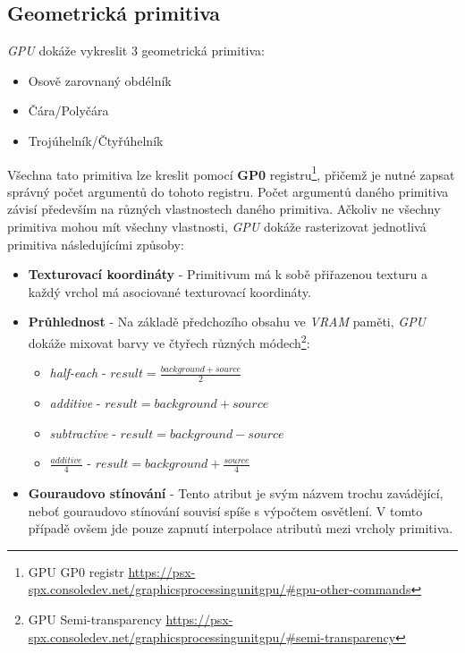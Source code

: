 \subsection{Geometrická primitiva}

\textit{GPU} dokáže vykreslit 3 geometrická primitiva:

\begin{itemize}
    \item{Osově zarovnaný obdélník}
    \item{Čára/Polyčára}
    \item{Trojúhelník/Čtyřúhelník}
\end{itemize}

Všechna tato primitiva lze kreslit pomocí \textbf{GP0} registru\footnote{GPU GP0 registr\cite{PSXSpec} \url{https://psx-spx.consoledev.net/graphicsprocessingunitgpu/\#gpu-other-commands}}, 
přičemž je nutné zapsat správný počet argumentů do tohoto registru.
Počet argumentů daného primitiva závisí především na různých vlastnostech daného primitiva. Ačkoliv ne všechny primitiva mohou mít
všechny vlastnosti, \textit{GPU} dokáže rasterizovat jednotlivá primitiva následujícími způsoby:

\begin{itemize}
    \item{\textbf{Texturovací koordináty} - Primitivum má k sobě přiřazenou texturu a každý vrchol má asociované texturovací koordináty.}
    \item{\textbf{Průhlednost} - Na základě předchozího obsahu ve \textit{VRAM} paměti, \textit{GPU} dokáže mixovat barvy ve čtyřech různých módech\footnote{GPU Semi-transparency\cite{PSXSpec} \url{https://psx-spx.consoledev.net/graphicsprocessingunitgpu/\#semi-transparency}}:
        \begin{itemize}
            \item{\textit{half-each} - $result = \frac{background + source}{2}$}
            \item{\textit{additive} - $result = background + source$}
            \item{\textit{subtractive} - $result = background - source$}
            \item{\textit{$\frac{additive}{4}$} - $result = background + \frac{source}{4}$}
        \end{itemize}
    }
    \item{\textbf{Gouraudovo stínování} - Tento atribut je svým názvem trochu zavádějící, neboť gouraudovo stínování souvisí spíše s výpočtem osvětlení. V tomto případě ovšem jde pouze zapnutí interpolace atributů mezi vrcholy primitiva.}
\end{itemize}

